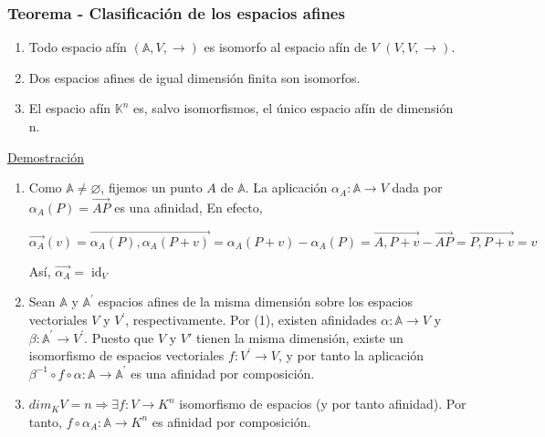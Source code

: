 \documentclass[12pt, a4paper, ones, notitlepage, openany,titlepage]{article}
\newcommand{\demostracion}{\noindent\underline{Demostración}}
\begin{document}
\subsubsection{Teorema - Clasificación de los espacios afines}
\begin{enumerate}[label=(\arabic*)]
	
	\item Todo espacio afín $(\mathbb{A}, V, \rightarrow)$ es isomorfo al espacio afín de $V$ $(V,V,\rightarrow)$.
	
	\item Dos espacios afines de igual dimensión finita son isomorfos.
	
	\item El espacio afín $\mathbb{K}^{n}$ es, salvo isomorfismos, el único espacio afín de dimensión n.
	
\end{enumerate}
\demostracion
\begin{enumerate}[label=(\arabic*)]
	
	\item Como $\mathbb{A}\ne\varnothing$, fijemos un punto $A$ de $\mathbb{A}$. La aplicación $\alpha_{A}: \mathbb{A} \rightarrow V$ dada por $\alpha_{A}(P)=\overrightarrow{A P}$ es una afinidad, En efecto,
	
	$$
	\overrightarrow{\alpha_{A}}(v)=\overrightarrow{\alpha_{A}(P), \alpha_{A}(P+v)}=\alpha_{A}(P+v)-\alpha_{A}(P)=\overrightarrow{A, P+v}-\overrightarrow{A P}=\overrightarrow{P, P+v}=v
	$$
	
	Así, $\overrightarrow{\alpha_{A}}=\operatorname{id}_{V}$
	
	\item Sean $\mathbb{A}$ y $\mathbb{A}^{\prime}$ espacios afines de la misma dimensión sobre los espacios vectoriales $V$ y $V^{\prime}$, respectivamente. Por (1), existen afinidades $\alpha: \mathbb{A} \rightarrow V$ y $\beta: \mathbb{A}^{\prime} \rightarrow V^{\prime}$. Puesto que $V$ y $V'$ tienen la misma dimensión, existe un isomorfismo de espacios vectoriales $f: V^{\prime} \rightarrow V$, y por tanto la aplicación $\beta^{-1} \circ f \circ \alpha: \mathbb{A} \rightarrow \mathbb{A}^{\prime}$ es una afinidad por composición.
	
	\item $dim_{K}V=n\Longrightarrow \exists f:V \longrightarrow K^{n}$ isomorfismo de espacios (y por tanto afinidad). Por tanto, $f \circ \alpha_{A}: \mathbb{A} \longrightarrow K^{n}$ es afinidad por composición.
	
\end{enumerate}
\end{document}
